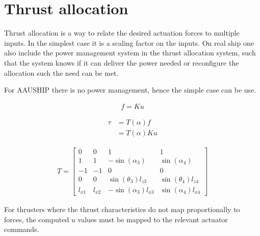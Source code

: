 \section{Thrust allocation}
\label{sec:thrust_allocation}

Thrust allocation is a way to relate the desired actuation forces to multiple inputs. In the simplest case it is a scaling factor on the inputs. On real ship one also include the power management system in the thrust allocation system, such that the system knows if it can deliver the power needed or reconfigure the allocation such the need can be met.

For AAUSHIP there is no power management, hence the simple case can be use.

\begin{align}
f  = K u
\label{eq:fKu}
\end{align}

\begin{subequations}
\begin{align}
 \tau &=  T ( \alpha)  f\\
&=  T (  \alpha)  K  u
\end{align}
\end{subequations}

\begin{align}
T =
\begin{bmatrix}
0 & 0 & 1 & 1\\
1 & 1 & -\sin(\alpha_3) & \sin(\alpha_4)\\
-1 & -1 & 0 & 0\\
0 & 0 & \sin(\theta_3) l_{z3} & \sin(\theta_4)l_{z4} \\
l_{x1} & l_{x2} & -\sin(\alpha_3) l_{x3} & \sin(\alpha_4) l_{x4}
\end{bmatrix}
\end{align}
\citep{mss}


For thrusters where the thrust characteristics do not map
proportionally to forces, the computed $u$ values must be mapped
to the relevant actuator commands.

